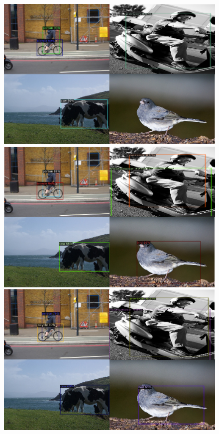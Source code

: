 \documentclass{article}
\begin{document}
\begin{figure}[h]
  \begin{minipage}{0.47\textwidth}
  \includegraphics[width=\textwidth, height=0.17\textheight]{./../../figures/1shotpascal.png}
  \subcaption{}
  \end{minipage}
  \begin{minipage}{0.47\textwidth}
  \includegraphics[width=\textwidth, height=0.17\textheight]{./../../figures/5shotpascal.png}
  \subcaption{}
  \end{minipage}
  \begin{minipage}{0.47\textwidth}
  \includegraphics[width=\textwidth, height=0.17\textheight]{./../../figures/10shotpascal.png}

\end{minipage}
\end{figure}
\end{document}
